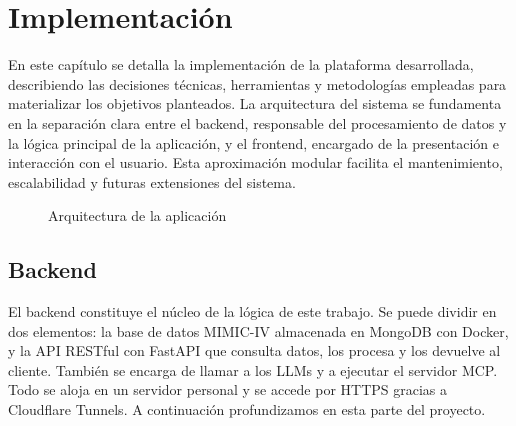 \chapter{Implementación}

En este capítulo se detalla la implementación de la plataforma desarrollada, describiendo las decisiones técnicas, herramientas y metodologías empleadas para materializar los objetivos planteados. La arquitectura del sistema se fundamenta en la separación clara entre el backend, responsable del procesamiento de datos y la lógica principal de la aplicación, y el frontend, encargado de la presentación e interacción con el usuario. Esta aproximación modular facilita el mantenimiento, escalabilidad y futuras extensiones del sistema. 

\begin{figure}[H]
  \centering
  \caption{Arquitectura de la aplicación}
  \label{fig:arch1}
\end{figure}

\section{Backend}

El backend constituye el núcleo de la lógica de este trabajo. Se puede dividir en dos elementos: la base de datos MIMIC-IV almacenada en MongoDB con Docker, y la API RESTful con FastAPI que consulta datos, los procesa y los devuelve al cliente. También se encarga de llamar a los LLMs y a ejecutar el servidor MCP. Todo se aloja en un servidor personal y se accede por HTTPS gracias a Cloudflare Tunnels. A continuación profundizamos en esta parte del proyecto.

